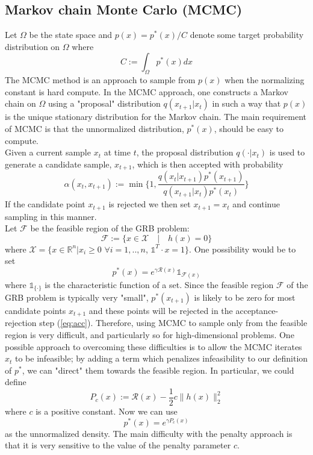 {\subsection{Markov chain Monte Carlo (MCMC)}
Let $\Omega$ be the state space and $p(x) = p^*(x)/C$ denote some target probability distribution on $\Omega$ where 
\begin{equation}
C := \int_{\Omega} p^*(x) dx
\end{equation}
The MCMC method is an approach to sample from $p(x)$ when the normalizing constant is hard compute. In the MCMC approach, one
constructs a Markov chain on $\Omega$ using a "proposal" distribution $q(x_{t+1}|x_t)$ in such a way that $p(x)$
is the unique stationary distribution for the Markov chain. The main requirement of MCMC is that the unnormalized distribution, $p^*(x)$, should be easy to compute. \\
Given a current sample $x_t$ at time $t$, the proposal distribution $q(\cdot | x_t)$ is used to generate
a candidate sample, $x_{t+1}$, which is then accepted with probability
\begin{equation}\label{eq:acc}
\alpha(x_t, x_{t+1}) := \min \Big\{ 1, \frac{q(x_t|x_{t+1})p^*(x_{t+1})}{q(x_{t+1}|x_t)p^*(x_t)}\Big\}
\end{equation}
If the candidate point $x_{t+1}$ is rejected we then set $x_{t+1} = x_t$ and continue sampling in this manner.\\
Let $\mathcal{F}$ be the feasible region of the GRB problem:
\begin{equation}
\mathcal{F} := \{ x \in \mathcal{X}\quad|\quad h(x) = 0\}
\end{equation}
where $\mathcal{X} = \{x \in \mathbb{R}^n | x_i \geq 0$ $\forall i=1,..,n$, $\mathds{1}^T\cdot x = 1\}$. One possibility would be to set
\begin{equation}
p^*(x) = e^{\gamma \mathcal{R}(x)}\mathds{1}_{\mathcal{F}(x)} 
\end{equation}
where $\mathds{1}_{\{\cdot\}}$ is the characteristic function of a set. Since the feasible region $\mathcal{F}$ of the GRB problem is typically very "small", $p^*(x_{t+1})$ is likely to be zero for most candidate points $x_{t+1}$ and these points will be rejected in the acceptance-rejection step (\ref{eq:acc}). Therefore, using MCMC to sample only from the feasible region is very difficult, and particularly so for high-dimensional problems. One possible approach to overcoming these difficulties is to allow the MCMC iterates $x_t$ to be infeasible; by adding a term which penalizes infeasibility to our definition of $p^*$, we can "direct" them towards the feasible region. In particular, we could define
\begin{equation}
P_c(x) := \mathcal{R}(x) - \frac{1}{2} c \parallel h(x) \parallel^2_2
\end{equation}
where $c$ is a positive constant. Now we can use
\begin{equation}
p^*(x) = e^{\gamma P_c(x)}
\end{equation}
as the unnormalized density. The main difficulty with the penalty approach is that it is very sensitive to the value of the penalty parameter $c$.

}
